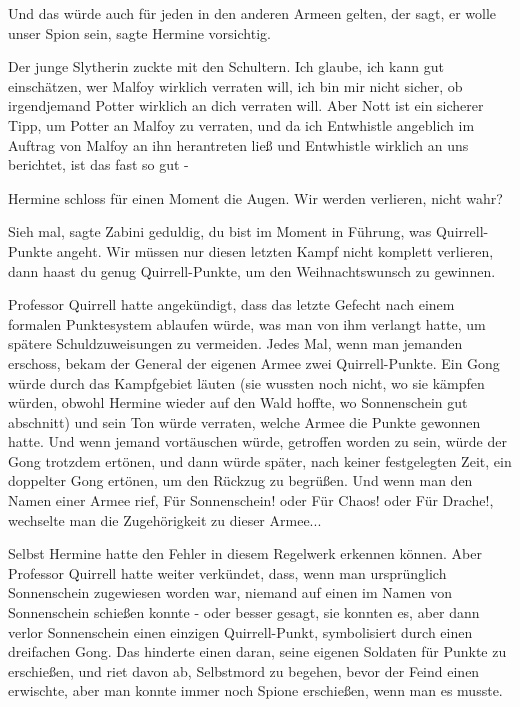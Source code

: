 \glqq{}Und das würde auch für jeden in den anderen Armeen gelten, der sagt, er
wolle unser Spion sein\grqq{}, sagte Hermine vorsichtig.

Der junge Slytherin zuckte mit den Schultern. \glqq{}Ich glaube, ich kann gut
einschätzen, wer Malfoy wirklich verraten will, ich bin mir nicht sicher, ob
irgendjemand Potter wirklich an dich verraten will. Aber Nott ist ein sicherer
Tipp, um Potter an Malfoy zu verraten, und da ich Entwhistle angeblich im
Auftrag von Malfoy an ihn herantreten ließ und Entwhistle wirklich an uns
berichtet, ist das fast so gut -\grqq{}

Hermine schloss für einen Moment die Augen. \glqq{}Wir werden verlieren, nicht
wahr?\grqq{}

\glqq{}Sieh mal\grqq{}, sagte Zabini geduldig, \glqq{}du bist im Moment in
Führung, was Quirrell-Punkte angeht. Wir müssen nur diesen letzten Kampf nicht
komplett verlieren, dann haast du genug Quirrell-Punkte, um den Weihnachtswunsch
zu gewinnen.\grqq{}

Professor Quirrell hatte angekündigt, dass das letzte Gefecht nach einem
formalen Punktesystem ablaufen würde, was man von ihm verlangt hatte, um spätere
Schuldzuweisungen zu vermeiden. Jedes Mal, wenn man jemanden erschoss, bekam der
General der eigenen Armee zwei Quirrell-Punkte. Ein Gong würde durch das
Kampfgebiet läuten (sie wussten noch nicht, wo sie kämpfen würden, obwohl
Hermine wieder auf den Wald hoffte, wo Sonnenschein gut abschnitt) und sein Ton
würde verraten, welche Armee die Punkte gewonnen hatte. Und wenn jemand
vortäuschen würde, getroffen worden zu sein, würde der Gong trotzdem ertönen,
und dann würde später, nach keiner festgelegten Zeit, ein doppelter Gong
ertönen, um den Rückzug zu begrüßen. Und wenn man den Namen einer Armee rief,
\glqq{}Für Sonnenschein!\grqq{} oder \glqq{}Für Chaos!\grqq{} oder \glqq{}Für
Drache!\grqq{}, wechselte man die Zugehörigkeit zu dieser Armee...

Selbst Hermine hatte den Fehler in diesem Regelwerk erkennen können. Aber
Professor Quirrell hatte weiter verkündet, dass, wenn man ursprünglich
Sonnenschein zugewiesen worden war, niemand auf einen im Namen von Sonnenschein
schießen konnte - oder besser gesagt, sie konnten es, aber dann verlor
Sonnenschein einen einzigen Quirrell-Punkt, symbolisiert durch einen dreifachen
Gong. Das hinderte einen daran, seine eigenen Soldaten für Punkte zu erschießen,
und riet davon ab, Selbstmord zu begehen, bevor der Feind einen erwischte, aber
man konnte immer noch Spione erschießen, wenn man es musste.


